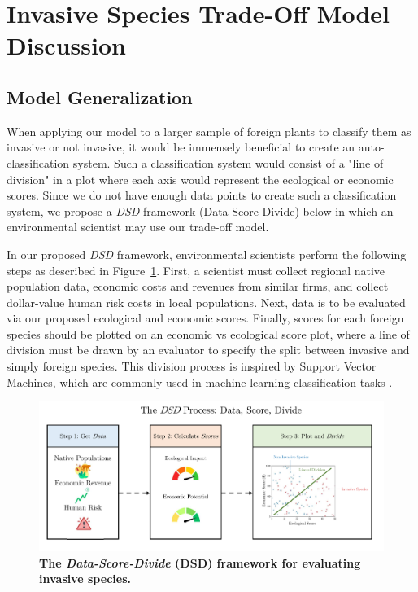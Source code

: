 \section{Invasive Species Trade-Off Model Discussion}

\subsection{Model Generalization}

When applying our model to a larger sample of foreign plants to classify them as invasive or not invasive, it would be immensely beneficial to create an auto-classification system. Such a classification system would consist of a "line of division" in a plot where each axis would represent the ecological or economic scores. Since we do not have enough data points to create such a classification system, we propose a \textit{DSD} framework (Data-Score-Divide) below in which an environmental scientist may use our trade-off model.

In our proposed \textit{DSD} framework, environmental scientists perform the following steps as described in Figure~\ref{fig:dsdprocess}. First, a scientist must collect regional native population data, economic costs and revenues from similar firms, and collect dollar-value human risk costs in local populations. Next, data is to be evaluated via our proposed ecological and economic scores. Finally, scores for each foreign species should be plotted on an economic vs ecological score plot, where a line of division must be drawn by an evaluator to specify the split between invasive and simply foreign species. This division process is inspired by Support Vector Machines, which are commonly used in machine learning classification tasks \cite{ieeeSupportVector}.


\begin{figure}[h!]
\centering
    \includegraphics[scale=0.5]{figures/dsdprocess.pdf}
    \captionsetup{width=0.9\textwidth}
    \caption{\textbf{The \textit{Data-Score-Divide} (DSD) framework for evaluating invasive species.}}
    \label{fig:dsdprocess}
\end{figure}

